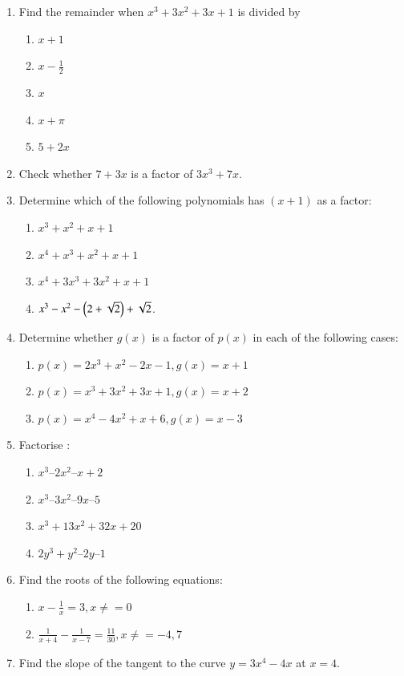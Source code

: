 \renewcommand{\theequation}{\theenumi}
\begin{enumerate}[label=\arabic*.,ref=\thesubsection.\theenumi]
\item Find the remainder when $x^3+3x^2+3x+1$ is divided by 
\begin{enumerate}
\item $x+1$
\item $x-\frac{1}{2}$
\item $x$
\item $x+\pi$
\item $5+2x$
\end{enumerate}
%
\item Check whether $7+3x$ is a factor of $3x^3+7x$.
%
\item Determine which of the following polynomials has $(x+1)$ as a factor:
%
\begin{enumerate}
\item $x^3+x^2+x+1$
\item $x^4+x^3+x^2+x+1$
\item $x^4+3x^3+3x^2+x+1$
\item $x^3-x^2-\left(2+\sqrt{2}\right)+\sqrt{2}$.
\end{enumerate}
%
\item Determine whether $g(x)$ is a factor of $p(x)$ in each of the following cases:
%
\begin{enumerate}
\item $p(x) = 2x^3+x^2-2x-1, g(x) = x+1$
\item $p(x) = x^3+3x^2+3x+1, g(x) = x+2$
\item $p(x) = x^4-4x^2+x+6, g(x) = x-3$
\end{enumerate}
%
\item  Factorise : 
\begin{enumerate}
\item $x^3 – 2x^2 – x + 2 $
\item $x^3– 3x^2 – 9x – 5 $
 \item $x^3+ 13x^2 + 32x + 20 $
\item $2y^3+ y^2– 2y – 1$
\end{enumerate}
\item Find the roots of the following equations:
\begin{enumerate}
\item  $x - \frac{1}{x} = 3, x \ne =0 $
\item  $ \frac{1}{x+4} - \frac{1}{x-7} = \frac{11}{30}, x\ne =-4, 7 $
\end{enumerate}
%
\item Find the slope of the tangent to the curve $y = 3x^4-4x$ at $x=4$.

\end{enumerate}
